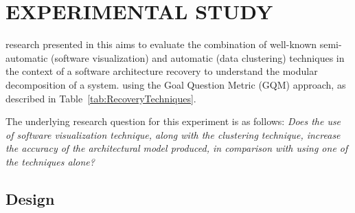 \section{EXPERIMENTAL STUDY}\label{sec:experiment}

  research presented in this  aims to evaluate the combination
of well-known semi-automatic (software visualization) and automatic (data clustering) techniques in the context of a 
software architecture recovery to understand the modular decomposition of a system.  using the 
Goal Question Metric (GQM) approach, as described in Table~\ref{tab:RecoveryTechniques}.
\begin{table}[!h]
	\centering
	\caption{Definition of the accuracy evaluation Software Architecture Recovery Techniques.}
	\label{tab:RecoveryTechniques}
\end{table}
The underlying research question for this experiment is as follows: 
\emph{Does the use of software visualization technique, along with the clustering technique, increase the accuracy of the architectural model produced, in comparison with using one of the techniques alone?}
  
\subsection{Design}%




